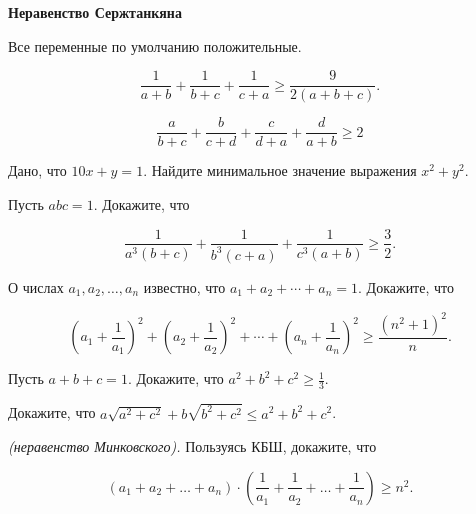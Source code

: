 \centerline{\bf \Huge Неравенство Сержтанкяна}

\begin{flushright}
        \scriptsize{Все переменные по умолчанию положительные.}
\end{flushright}



$$
\dfrac{1}{a+b}+\dfrac{1}{b+c}+\dfrac{1}{c+a} \geqslant \dfrac{9}{2(a+b+c)} .
$$


$$
\dfrac{a}{b+c}+\dfrac{b}{c+d}+\dfrac{c}{d+a}+\dfrac{d}{a+b} \geqslant 2
$$

Дано, что $10 x+y=1$. Найдите минимальное значение выражения $x^2+y^2$.

Пусть $a b c=1$. Докажите, что

$$
\dfrac{1}{a^3(b+c)}+\dfrac{1}{b^3(c+a)}+\dfrac{1}{c^3(a+b)} \geqslant \dfrac{3}{2} .
$$


О числах $a_1, a_2, \ldots, a_n$ известно, что $a_1+a_2+\cdots+a_n=1$. Докажите, что

$$
\left(a_1+\dfrac{1}{a_1}\right)^2+\left(a_2+\dfrac{1}{a_2}\right)^2+\cdots+\left(a_n+\dfrac{1}{a_n}\right)^2 \geqslant \dfrac{\left(n^2+1\right)^2}{n} .
$$


Пусть $a+b+c=1$. Докажите, что $a^2+b^2+c^2 \geqslant \frac{1}{3}$.

Докажите, что $a \sqrt{a^2+c^2}+b \sqrt{b^2+c^2} \leqslant a^2+b^2+c^2$.

\textit{(неравенство Минковского).} Пользуясь КБШ, докажите, что

$$
\left(a_1+a_2+\ldots+a_n\right) \cdot\left(\frac{1}{a_1}+\frac{1}{a_2}+\ldots+\frac{1}{a_n}\right) \geqslant n^2 .
$$